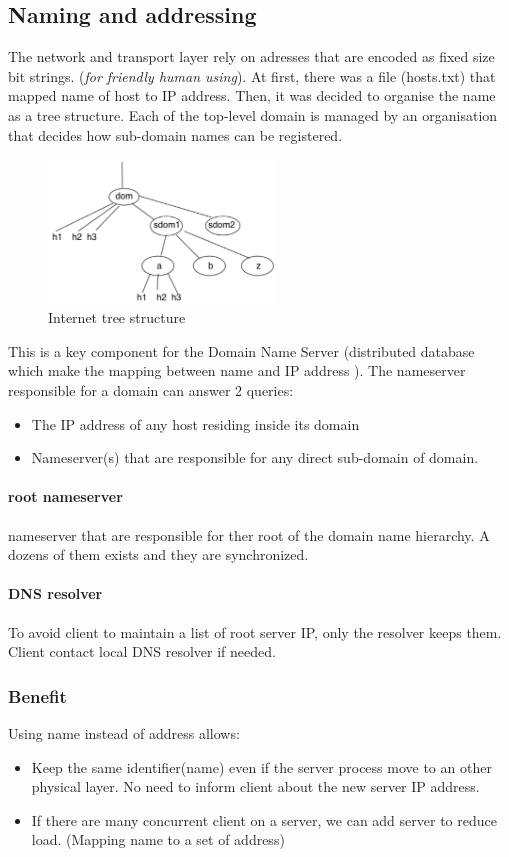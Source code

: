 \subsection{Naming and addressing}
The network and transport layer rely on adresses that are encoded as fixed size bit
strings. (\textit{for friendly human using}). At first, there was a file (hosts.txt) that mapped name of host to
IP address.
Then, it was decided to organise the name as a tree structure. Each of the top-level domain is managed by 
an organisation that decides how sub-domain names can be registered.
\begin{figure}[h]
    \centering
    \includegraphics[width=6cm]{internet.png}
    \caption{Internet tree structure}
\end{figure}
This is a key component for the Domain Name Server (distributed database which make the mapping 
between name and IP address ). The nameserver responsible for a domain can answer 2 queries:
\begin{itemize}
	\item The IP address of any host residing inside its domain
	\item Nameserver(s) that are responsible for any direct sub-domain of domain.
\end{itemize}
\paragraph{root nameserver} nameserver that are responsible for ther root of the domain name hierarchy. A 
dozens of them exists and they are synchronized. 
\paragraph{DNS resolver} To avoid client to maintain a list of root server IP, only the resolver keeps them. 
Client contact local DNS resolver if needed.
\subsubsection{Benefit}
Using name instead of address allows:
\begin{itemize}
	\item Keep the same identifier(name) even if the server process move to an other physical layer. No need 
	to inform client about the new server IP address.
	\item If there are many concurrent client on a server, we can add server to reduce load. (Mapping name 
	to a set of address)
\end{itemize}

